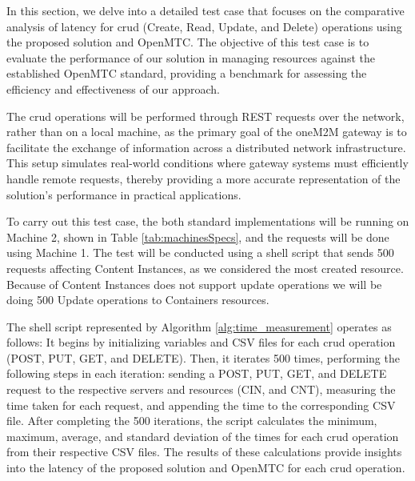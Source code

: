 \documentclass[a4paper,fleqn]{cas-dc}
\begin{document}
In this section, we delve into a detailed test case that focuses on the comparative analysis of latency for \gls{crud} (Create, Read, Update, and Delete) operations using the proposed solution and OpenMTC. The objective of this test case is to evaluate the performance of our solution in managing resources against the established OpenMTC standard, providing a benchmark for assessing the efficiency and effectiveness of our approach.

The \gls{crud} operations will be performed through REST requests over the network, rather than on a local machine, as the primary goal of the oneM2M gateway is to facilitate the exchange of information across a distributed network infrastructure. This setup simulates real-world conditions where gateway systems must efficiently handle remote requests, thereby providing a more accurate representation of the solution's performance in practical applications.

To carry out this test case, the both standard implementations will be running on Machine 2, shown in Table \ref{tab:machinesSpecs}, and the requests will be done using Machine 1. The test will be conducted using a shell script that sends 500 requests affecting Content Instances, as we considered the most created resource. Because of Content Instances does not support update operations we will be doing 500 Update operations to Containers resources.

The shell script represented by Algorithm \ref{alg:time_measurement} operates as follows: It begins by initializing variables and CSV files for each \gls{crud} operation (POST, PUT, GET, and DELETE). Then, it iterates 500 times, performing the following steps in each iteration: sending a POST, PUT, GET, and DELETE request to the respective servers and resources (CIN, and CNT), measuring the time taken for each request, and appending the time to the corresponding CSV file. After completing the 500 iterations, the script calculates the minimum, maximum, average, and standard deviation of the times for each \gls{crud} operation from their respective CSV files. The results of these calculations provide insights into the latency of the proposed solution and OpenMTC for each \gls{crud} operation.
\end{document}
